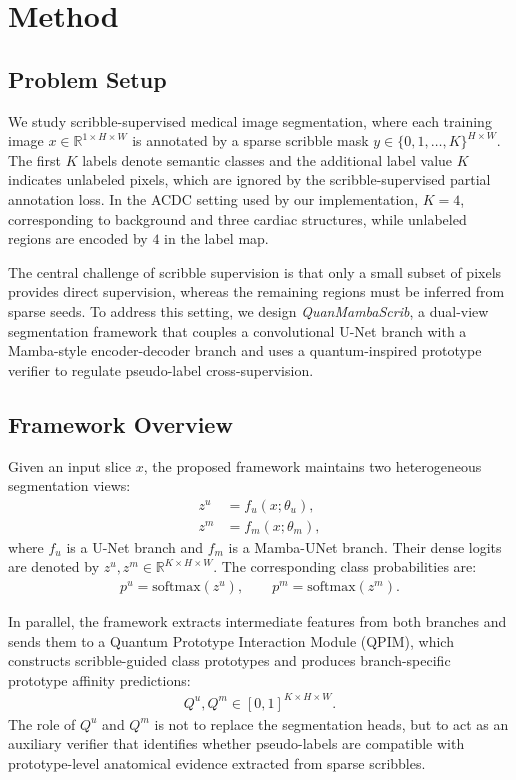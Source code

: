 \section{Method}
\label{sec:method}

\subsection{Problem Setup}
\label{subsec:problem_setup}
We study scribble-supervised medical image segmentation, where each training image $x \in \mathbb{R}^{1 \times H \times W}$ is annotated by a sparse scribble mask $y \in \{0,1,\dots,K\}^{H \times W}$. The first $K$ labels denote semantic classes and the additional label value $K$ indicates unlabeled pixels, which are ignored by the scribble-supervised partial annotation loss. In the ACDC setting used by our implementation, $K=4$, corresponding to background and three cardiac structures, while unlabeled regions are encoded by $4$ in the label map.

The central challenge of scribble supervision is that only a small subset of pixels provides direct supervision, whereas the remaining regions must be inferred from sparse seeds. To address this setting, we design \emph{QuanMambaScrib}, a dual-view segmentation framework that couples a convolutional U-Net branch with a Mamba-style encoder-decoder branch and uses a quantum-inspired prototype verifier to regulate pseudo-label cross-supervision.

\subsection{Framework Overview}
\label{subsec:framework_overview}
Given an input slice $x$, the proposed framework maintains two heterogeneous segmentation views:
\begin{align}
    z^u &= f_u(x; \theta_u), \\
    z^m &= f_m(x; \theta_m),
\end{align}
where $f_u$ is a U-Net branch and $f_m$ is a Mamba-UNet branch. Their dense logits are denoted by $z^u, z^m \in \mathbb{R}^{K \times H \times W}$. The corresponding class probabilities are:
\begin{align}
    p^u = \mathrm{softmax}(z^u), \qquad
    p^m = \mathrm{softmax}(z^m).
\end{align}

In parallel, the framework extracts intermediate features from both branches and sends them to a Quantum Prototype Interaction Module (QPIM), which constructs scribble-guided class prototypes and produces branch-specific prototype affinity predictions:
\begin{align}
    Q^u, Q^m \in [0,1]^{K \times H \times W}.
\end{align}
The role of $Q^u$ and $Q^m$ is not to replace the segmentation heads, but to act as an auxiliary verifier that identifies whether pseudo-labels are compatible with prototype-level anatomical evidence extracted from sparse scribbles.

